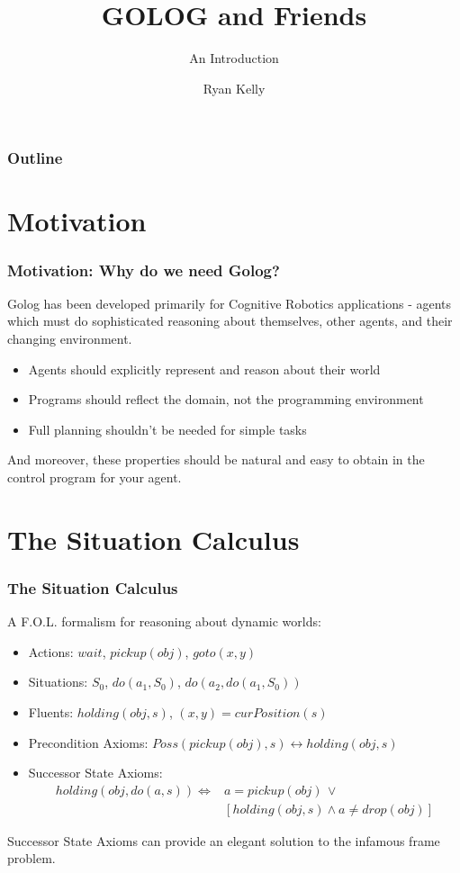 \documentclass{beamer}
\title{GOLOG and Friends}
\subtitle{An Introduction}
\author{Ryan Kelly}
\begin{document}
\begin{frame}
  \titlepage
\end{frame}

\begin{frame}
  \frametitle{Outline}
  \tableofcontents
\end{frame}

\section{Motivation}

\begin{frame}
\frametitle{Motivation: Why do we need Golog?}
Golog has been developed primarily for Cognitive Robotics applications - agents
which must do sophisticated reasoning about themselves, other agents, and their
changing environment.
\begin{itemize}
\item Agents should explicitly represent and reason about their world
\item Programs should reflect the domain, not the programming environment
\item Full planning shouldn't be needed for simple tasks
\end{itemize}
And moreover, these properties should be natural and easy to obtain in the
control program for your agent.
\end{frame}


\section{The Situation Calculus}

\begin{frame}
\frametitle{The Situation Calculus}

A F.O.L. formalism for reasoning about dynamic worlds:

\begin{itemize}
\pause
\item Actions: $wait$, $pickup(obj)$, $goto(x,y)$
\pause
\item Situations: $S_{0}$, $do(a_{1},S_{0})$, $do(a_{2},do(a_{1},S_{0}))$
\pause
\item Fluents: $holding(obj,s)$, $(x,y)=curPosition(s)$
\pause
\item Precondition Axioms: $Poss(pickup(obj),s) \leftrightarrow holding(obj,s)$
\pause
\item Successor State Axioms:\[
\begin{array}{cc}
holding(obj,do(a,s))\iff & a=pickup(obj)\,\vee\\
 & \left[holding(obj,s)\wedge a\neq drop(obj)\right]\end{array}\]
\end{itemize}
\pause
Successor State Axioms can provide an elegant solution to the infamous
frame problem.
\end{frame}
\end{document}
